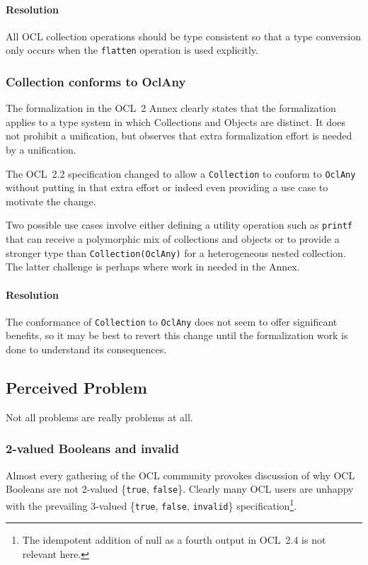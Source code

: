 \documentclass{jot}
\begin{document}
\paragraph{Resolution} All OCL collection operations should be type consistent so that a type conversion only occurs when the \verb$flatten$ operation is used explicitly.

\subsubsection{Collection conforms to OclAny}

The formalization in the OCL~2 Annex clearly states that the formalization applies to a type system in which Collections and Objects are distinct. It does not prohibit a unification, but observes that extra formalization effort is needed by a unification.

The OCL~2.2 specification changed to allow a \verb$Collection$ to conform to \verb$OclAny$ without putting in that extra effort or indeed even providing a use case to motivate the change.

Two possible use cases involve either defining a utility operation such as \verb$printf$ that can receive a polymorphic mix of collections and objects or to provide a stronger type than \verb$Collection(OclAny)$ for a heterogeneous nested collection. The latter challenge is perhaps where work in needed in the Annex.

\paragraph{Resolution} The conformance of \verb$Collection$ to \verb$OclAny$ does not seem to offer significant benefits, so it may be best to revert this change until the formalization work is done to understand its consequences. 

\subsection{Perceived Problem}

Not all problems are really problems at all.

\subsubsection{2-valued Booleans and invalid}

Almost every gathering of the OCL community provokes discussion of why OCL Booleans are not 2-valued \{\verb$true$, \verb$false$\}. Clearly many OCL users are unhappy with the prevailing 3-valued \{\verb$true$, \verb$false$, \verb$invalid$\} specification\footnote{The idempotent addition of null as a fourth output in OCL~2.4 is not relevant here.}.
\end{document}
